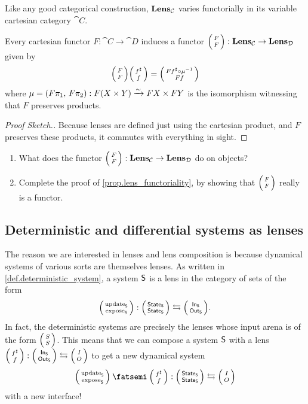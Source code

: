 \documentclass[DynamicalBook]{subfiles}
\begin{document}
Like any good categorical construction, $\textbf{Lens}_{\mathcal{C}}$ varies
functorially in its variable cartesian category $\cat{C}$.
\begin{proposition}\label{prop.lens_functoriality}
  Every cartesian functor $F : \cat{C} \to \cat{D}$ induces a functor
  $\lens{F}{F} : \Cat{Lens}_{\cat{C}} \to \Cat{Lens}_{\cat{D}}$ given by
  $$\lens{F}{F}\lens{f^{\sharp}}{f} = \lens{Ff^{\sharp} \circ \mu\inv}{Ff}$$
  where $\mu = (F\pi_1,\, F\pi_2) : F(X \times Y) \xrightarrow{\sim} FX \times FY$ is
  the isomorphism witnessing that $F$ preserves products.
\end{proposition}
\begin{proof}[Proof Sketch.]
  Because lenses are defined just using the cartesian product, and $F$ preserves
  these products, it commutes with everything in sight.
\end{proof}

\begin{exercise}
 \begin{enumerate}
 	\item What does the functor $\lens FF: \Cat{Lens}_{\cat{C}} \to \Cat{Lens}_{\cat{D}}$ do on objects?
	\item Complete the proof of \cref{prop.lens_functoriality}, by showing that $\lens FF$ really is a functor.
	\qedhere
\end{enumerate}
\end{exercise}

\subsection{Deterministic and differential systems as lenses}

The reason we are interested in lenses and lens composition is because
dynamical systems of various sorts are themselves lenses. As written in
\cref{def.deterministic_system}, a system $\mathsf{S}$ is a lens in the category of
sets of the form
$$\lens{\update{S}}{\expose{S}} : \lens{\State{S}}{\State{S}} \leftrightarrows \lens{\In{S}}{\Out{S}}.$$
In fact, the deterministic systems are precisely the lenses whose input arena is of the form $\lens SS$. This means that we can compose
a system $\mathsf{S}$ with a lens $\lens{f^{\sharp}}{f} : \lens{\In{S}}{\Out{S}}
\leftrightarrows \lens{I}{O}$ to get a new dynamical system
$$  \lens{\update{S}}{\expose{S}} \then \lens{f^{\sharp}}{f} :
\lens{\State{S}}{\State{S}} \leftrightarrows \lens{I}{O}$$
with a new interface!
\end{document}

